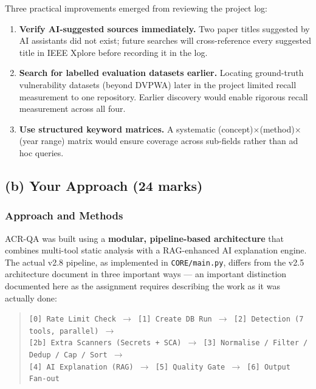 \documentclass[12pt,a4paper]{article}
\begin{document}
Three practical improvements emerged from reviewing the project log:

\begin{enumerate}[leftmargin=1.5em]
  \item \textbf{Verify AI-suggested sources immediately.}  Two paper titles
  suggested by AI assistants did not exist; future searches will cross-reference
  every suggested title in IEEE Xplore before recording it in the log.
  \item \textbf{Search for labelled evaluation datasets earlier.}  Locating
  ground-truth vulnerability datasets (beyond DVPWA) later in the project
  limited recall measurement to one repository.  Earlier discovery would enable
  rigorous recall measurement across all four.
  \item \textbf{Use structured keyword matrices.}  A systematic
  (concept)$\times$(method)$\times$(year range) matrix would ensure coverage
  across sub-fields rather than ad hoc queries.
\end{enumerate}

\subsection{(b) Your Approach (24 marks)}

\subsubsection{Approach and Methods}

ACR-QA was built using a \textbf{modular, pipeline-based architecture} that combines
multi-tool static analysis with a RAG-enhanced AI explanation engine.  The actual
v2.8 pipeline, as implemented in \texttt{CORE/main.py}, differs from the v2.5
architecture document in three important ways --- an important distinction documented
here as the assignment requires describing the work as it was actually done:

\begin{quote}
\footnotesize
\texttt{[0] Rate Limit Check $\to$ [1] Create DB Run $\to$ [2] Detection (7 tools, parallel) $\to$}\\
\texttt{[2b] Extra Scanners (Secrets + SCA) $\to$ [3] Normalise / Filter / Dedup / Cap / Sort $\to$}\\
\texttt{[4] AI Explanation (RAG) $\to$ [5] Quality Gate $\to$ [6] Output Fan-out}
\end{quote}
\end{document}
